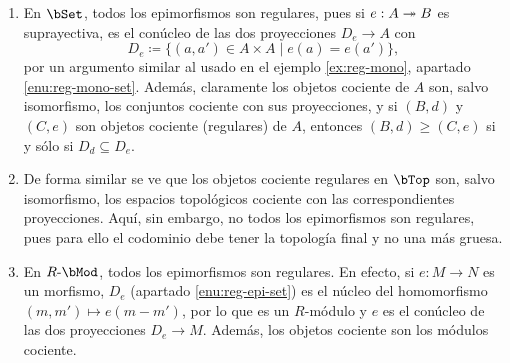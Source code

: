\begin{example}\;
  \begin{enumerate}
  \item \label{enu:reg-epi-set} En $\bSet$, todos los epimorfismos son
    regulares, pues si $e:A\twoheadrightarrow B$ es suprayectiva, es el conúcleo de las dos
    proyecciones $D_e\to A$ con
    \[D_e\coloneqq\{(a,a')\in A\times A\mid e(a)=e(a')\},\] por un argumento
    similar al usado en el ejemplo \ref{ex:reg-mono}, apartado
    \ref{enu:reg-mono-set}. Además, claramente los objetos cociente de $A$ son,
    salvo isomorfismo, los conjuntos cociente con sus proyecciones, y si $(B,d)$
    y $(C,e)$ son objetos cociente (regulares) de $A$, entonces $(B,d)\geq(C,e)$
    si y sólo si $D_d\subseteq D_e$.
  \item De forma similar se ve que los objetos cociente regulares en $\bTop$
    son, salvo isomorfismo, los espacios topológicos cociente con las
    correspondientes proyecciones. Aquí, sin embargo, no todos los epimorfismos
    son regulares, pues para ello el codominio debe tener la topología final y
    no una más gruesa.
  \item En $R\dash\bMod$, todos los epimorfismos son regulares. En efecto, si
    $e:M\to N$ es un morfismo, $D_e$ (apartado \ref{enu:reg-epi-set}) es el
    núcleo del homomorfismo $(m,m')\mapsto e(m-m')$, por lo que es un $R$-módulo
    y $e$ es el conúcleo de las dos proyecciones $D_e\to M$. Además, los objetos
    cociente son los módulos cociente.
  \end{enumerate}
\end{example}

